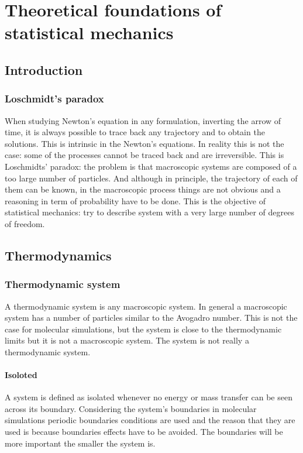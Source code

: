 \chapter{Theoretical foundations of statistical mechanics}

\section{Introduction}

	\subsection{Loschmidt's paradox}
	When studying Newton's equation in any formulation, inverting the arrow of time, it is always possible to trace back any trajectory and to obtain the solutions.
	This is intrinsic in the Newton's equations.
	In reality this is not the case: some of the processes cannot be traced back and are irreversible.
	This is	Loschmidts' paradox: the problem is that macroscopic systems are composed of a too large number of particles.
	And although in principle, the trajectory of each of them can be known, in the macroscopic process things are not obvious and a reasoning in term of probability have to be done.
	This is the objective of statistical mechanics: try to describe system with a very large number of degrees of freedom.

\section{Thermodynamics}

	\subsection{Thermodynamic system}
	A thermodynamic system is any macroscopic system.
	In general a macroscopic system has a number of particles similar to the Avogadro number.
	This is not the case for molecular simulations, but the system is close to the thermodynamic limits but it is not a macroscopic system.
	The system is not really a thermodynamic system.

		\subsubsection{Isoloted}
		A system is defined as isolated whenever no energy or mass transfer can be seen across its boundary.
		Considering the system's boundaries in molecular simulations periodic boundaries conditions are used and the reason that they are used is because boundaries effects have to be avoided.
		The boundaries will be more important the smaller the system is.


